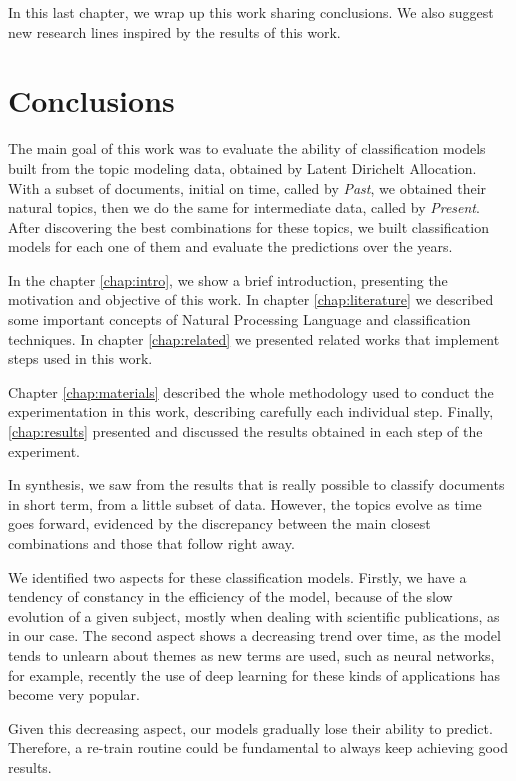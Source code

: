 In this last chapter, we wrap up this work sharing conclusions. We also suggest new research lines inspired by the results of this work.

\section{Conclusions}

The main goal of this work was to evaluate the ability of classification models built from the topic modeling data, obtained by Latent Dirichelt Allocation. With a subset of documents, initial on time, called by \textit{Past}, we obtained their natural topics, then we do the same for intermediate data, called by \textit{Present}. After discovering the best combinations for these topics, we built classification models for each one of them and evaluate the predictions over the years.

In the chapter \ref{chap:intro}, we show a brief introduction, presenting the motivation and objective of this work. In chapter \ref{chap:literature} we described some important concepts of Natural Processing Language and classification techniques. In chapter \ref{chap:related} we presented related works that implement steps used in this work. 

Chapter \ref{chap:materials} described the whole methodology used to conduct the experimentation in this work, describing carefully each individual step. Finally, \ref{chap:results} presented and discussed the results obtained in each step of the experiment.

In synthesis, we saw from the results that is really possible to classify documents in short term, from a little subset of data. However, the topics evolve as time goes forward, evidenced by the discrepancy between the main closest combinations and those that follow right away.

We identified two aspects for these classification models. Firstly, we have a tendency of constancy in the efficiency of the model, because of the slow evolution of a given subject, mostly when dealing with scientific publications, as in our case. The second aspect shows a decreasing trend over time, as the model tends to unlearn about themes as new terms are used, such as neural networks, for example, recently the use of deep learning for these kinds of applications has become very popular.

Given this decreasing aspect, our models gradually lose their ability to predict. Therefore, a re-train routine could be fundamental to always keep achieving good results.

